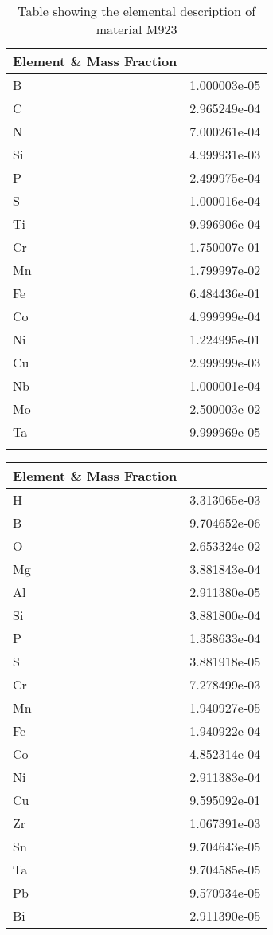 \begin{centering}
\begin{longtable}[ht!]
\caption{Table showing the elemental description of material M937}
\label{table:material_UppWaterPipes}
\end{longtable}
\clearpage

\begin{longtable}[ht!]
{ p{} | p{} }
\hline
Element \& Mass Fraction\\
\hline
B &  1.000003e-05\\
C &  2.965249e-04\\
N &  7.000261e-04\\
Si &  4.999931e-03\\
P &  2.499975e-04\\
S &  1.000016e-04\\
Ti &  9.996906e-04\\
Cr &  1.750007e-01\\
Mn &  1.799997e-02\\
Fe &  6.484436e-01\\
Co &  4.999999e-04\\
Ni &  1.224995e-01\\
Cu &  2.999999e-03\\
Nb &  1.000001e-04\\
Mo &  2.500003e-02\\
Ta &  9.999969e-05\\

\caption{Table showing the elemental description of material M923}
\label{table:material_EppValves}
\end{longtable}
\clearpage

\begin{longtable}[ht!]
{ p{} | p{} }
\hline
Element \& Mass Fraction\\
\hline

H &  3.313065e-03\\
B &  9.704652e-06\\
O &  2.653324e-02\\
Mg &  3.881843e-04\\
Al &  2.911380e-05\\
Si &  3.881800e-04\\
P &  1.358633e-04\\
S &  3.881918e-05\\
Cr &  7.278499e-03\\
Mn &  1.940927e-05\\
Fe &  1.940922e-04\\
Co &  4.852314e-04\\
Ni &  2.911383e-04\\
Cu &  9.595092e-01\\
Zr &  1.067391e-03\\
Sn &  9.704643e-05\\
Ta &  9.704585e-05\\
Pb &  9.570934e-05\\
Bi &  2.911390e-05\\


\end{longtable}
\end{centering}
